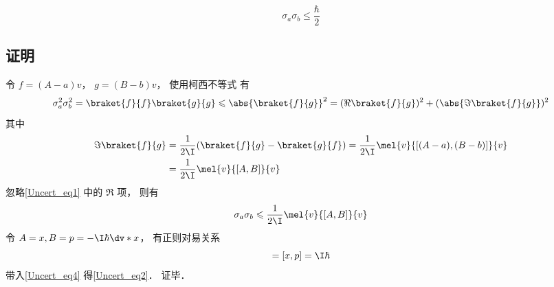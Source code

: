 

\begin{equation}\label{Uncert_eq2}
\sigma_a \sigma_b \leqslant \frac{\hbar}{2}
\end{equation}

\subsection{证明}
令 $f = (A-a)v$， $g = (B-b)v$， 使用柯西不等式 有
\begin{equation}\label{Uncert_eq1}
\sigma_a^2 \sigma_b^2 = \braket{f}{f} \braket{g}{g} \leqslant \abs{\braket{f}{g}}^2 = (\Re\braket{f}{g})^2 + (\abs{\Im\braket{f}{g}})^2
\end{equation}
其中
\begin{equation}
\begin{aligned}
\Im\braket{f}{g} &= \frac{1}{2\I}(\braket{f}{g} - \braket{g}{f})
= \frac{1}{2\I}\mel{v}{[(A-a), (B-b)]}{v}\\
&= \frac{1}{2\I}\mel{v}{[A, B]}{v}
\end{aligned}
\end{equation}
忽略\autoref{Uncert_eq1} 中的 $\Re$ 项， 则有
\begin{equation}\label{Uncert_eq4}
\sigma_a \sigma_b \leqslant \frac{1}{2\I}\mel{v}{[A, B]}{v}
\end{equation}
令 $A = x, B = p = -\I\hbar \dv*{x}$， 有正则对易关系
\begin{equation}
[A, B] = [x, p] = \I\hbar
\end{equation}
带入\autoref{Uncert_eq4} 得\autoref{Uncert_eq2}． 证毕．
